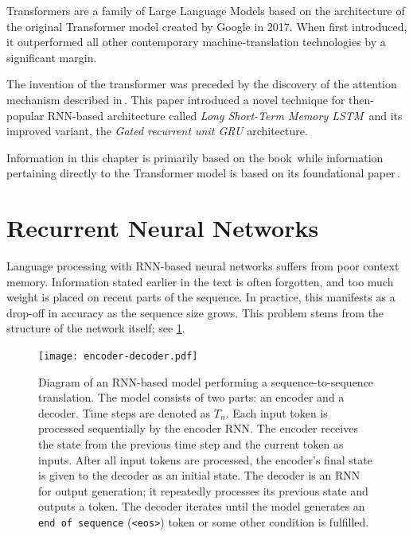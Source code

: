 Transformers are a family of Large Language Models based on the architecture of the original Transformer model created by Google in 2017. When first introduced, it outperformed all other contemporary machine-translation technologies by a significant margin. 

\medskip
The invention of the transformer was preceded by the discovery of the attention mechanism described in\,\cite{bahdanau2016neural}. This paper introduced a novel technique for then-popular RNN-based architecture called \emph{Long Short-Term Memory LSTM}\,\cite{lstm1997} and its improved variant, the \emph{Gated recurrent unit GRU}\cite{gru2014} architecture. 

\medskip

Information in this chapter is primarily based on the book\,\cite{SpeechLanguageFeb2024} while information pertaining directly to the Transformer model is based on its foundational paper\,\cite{Transformer2023}.

\section{Recurrent Neural Networks}

Language processing with RNN-based neural networks suffers from poor context memory. Information stated earlier in the text is often forgotten, and too much weight is placed on recent parts of the sequence. In practice, this manifests as a drop-off in accuracy as the sequence size grows. This problem stems from the structure of the network itself; see \ref{fig:rnn}.

\begin{figure}[ht]
  \centering
  \texttt{[image: encoder-decoder.pdf]}
  \caption{
    Diagram of an RNN-based model performing a sequence-to-sequence translation. The model consists of two parts: an encoder and a decoder. Time steps are denoted as \(T_{n}\). Each input token is processed sequentially by the encoder RNN. The encoder receives the state from the previous time step and the current token as inputs.
    After all input tokens are processed, the encoder's final state is given to the decoder as an initial state.
  The decoder is an RNN for output generation; it repeatedly processes its previous state and outputs a token. The decoder iterates until the model generates an \texttt{end of sequence} (\texttt{<eos>}) token or some other condition is fulfilled.
  }
  \label{fig:rnn}
\end{figure}

